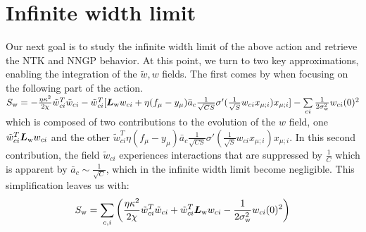 \section{Infinite width limit}
Our next goal is to study the infinite width limit of the above action and retrieve the NTK and NNGP behavior. At this point, we turn to two key approximations, enabling the integration of the $\tilde{w},w$ fields.
The first comes by when focusing on the following part of the action.
$S_{\rm w}=-\frac{\eta\kappa^2}{2\chi} \tilde{w}_{ci}^T \tilde{w}_{ci} 
    - \tilde{w}_{ci}^T [\bm{L}_{\rm w} w_{ci}+\eta (f_{\mu}-y_\mu) \bar{a}_{c} \frac{1}{\sqrt{CS}}\sigma'(\frac{1}{\sqrt{S}} w_{ci} x_{\mu;i}) x_{\mu;i}] -\sum\limits_{ci}\frac{1}{2\sigma_{\rm w}^2}w_{ci}(0)^2$
which is composed of two contributions to the evolution of the $w$ field, one $\tilde{w}_{ci}^T\bm{L}_{\rm w} w_{ci}$ and the other $\tilde{w}_{ci}^T\eta (f_{\mu}-y_\mu) \bar{a}_{c} \frac{1}{\sqrt{CS}} \sigma'(\frac{1}{\sqrt{S}} w_{ci} x_{\mu;i}) x_{\mu;i}$. In this second contribution, the field $\tilde{w}_{ci}$ experiences interactions that are suppressed by $\frac{1}{C}$ which is apparent by $\bar{a}_c\sim\frac{1}{\sqrt{C}}$, which in the infinite width limit become negligible.
This simplification leaves us with:
\begin{equation}
    S_{\rm w}=\sum\limits_{c,i}\left(\frac{\eta\kappa^2}{2\chi} \tilde{w}_{ci}^T \tilde{w}_{ci} + \tilde{w}_{ci}^T \bm{L}_{\rm w} w_{ci}-\frac{1}{2\sigma_{\rm w}^2}w_{ci}(0)^2\right)
\end{equation}



